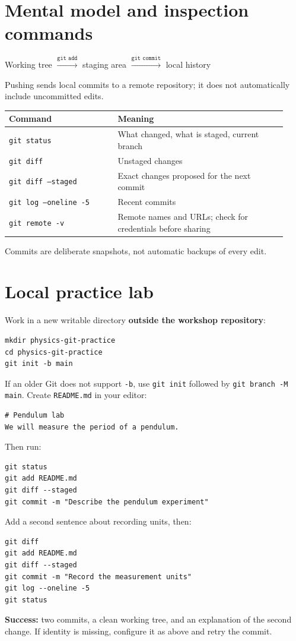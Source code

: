 \documentclass[11pt]{article}
\begin{document}
\section{Mental model and inspection commands}
\begin{center}
Working tree $\xrightarrow{\texttt{git add}}$ staging area
$\xrightarrow{\texttt{git commit}}$ local history
\end{center}
Pushing sends local commits to a remote repository; it does not automatically
include uncommitted edits.
\begin{longtable}{p{0.36\linewidth}p{0.57\linewidth}}
\toprule Command & Meaning\\ \midrule
\texttt{git status} & What changed, what is staged, current branch\\
\texttt{git diff} & Unstaged changes\\
\texttt{git diff --staged} & Exact changes proposed for the next commit\\
\texttt{git log --oneline -5} & Recent commits\\
\texttt{git remote -v} & Remote names and URLs; check for credentials before sharing\\
\bottomrule
\end{longtable}
Commits are deliberate snapshots, not automatic backups of every edit.

\section{Local practice lab}\label{sec:local-lab}
Work in a new writable directory \textbf{outside the workshop repository}:
\begin{lstlisting}
mkdir physics-git-practice
cd physics-git-practice
git init -b main
\end{lstlisting}
If an older Git does not support \texttt{-b}, use \texttt{git init} followed
by \texttt{git branch -M main}.
Create \texttt{README.md} in your editor:
\begin{lstlisting}
# Pendulum lab
We will measure the period of a pendulum.
\end{lstlisting}
Then run:
\begin{lstlisting}
git status
git add README.md
git diff --staged
git commit -m "Describe the pendulum experiment"
\end{lstlisting}
Add a second sentence about recording units, then:
\begin{lstlisting}
git diff
git add README.md
git diff --staged
git commit -m "Record the measurement units"
git log --oneline -5
git status
\end{lstlisting}
\textbf{Success:} two commits, a clean working tree, and an explanation of the
second change. If identity is missing, configure it as above and retry the commit.
\end{document}

